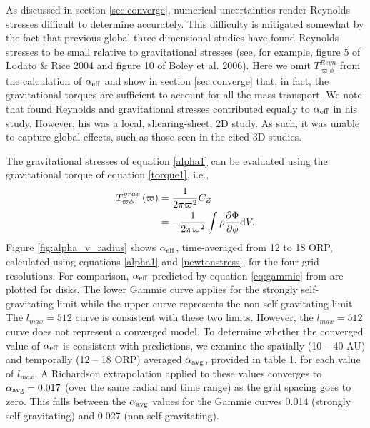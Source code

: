 \documentclass[manuscript]{aastex}
\begin{document}
  

As discussed in section \ref{sec:converge}, numerical uncertainties render Reynolds stresses difficult to
determine accurately.  This difficulty is mitigated somewhat by the fact that previous global three
dimensional studies have found Reynolds stresses to be small relative to gravitational stresses (see, for
example, figure 5 of Lodato \& Rice 2004 and figure 10 of Boley et al. 2006).  Here we omit
$T_{\varpi\phi}^{Reyn}$ from the calculation of $\alpha_{\rm{eff}}$ and show in section \ref{sec:converge}
that, in fact, the gravitational torques are sufficient to account for all the mass transport.  We note that
\cite{gammie2001} found Reynolds and gravitational stresses contributed equally to $\alpha_{\rm{eff}}$ in his
study.  However, his was a local, shearing-sheet, 2D study.  As such, it was unable to capture global effects,
such as those seen in the cited 3D studies.


The gravitational stresses of equation \eqref{alpha1} can be evaluated using the gravitational torque of equation \eqref{torque1}, i.e.,
\begin{equation}
\label{newtonstress}
\begin{split}
 T_{\varpi\phi}^{grav}\left( \varpi \right) & = \frac{1}{2\pi\varpi^2}C_Z\\
                                & = - \frac{1}{2\pi\varpi^2} \int \rho\frac{\partial\Phi}{\partial\phi} {\rm d}V.
\end{split}
\end{equation}
Figure \ref{fig:alpha_v_radius} shows $\alpha_{\rm{eff}}$, time-averaged from 12 to 18 ORP, calculated using equations \eqref{alpha1} and \eqref{newtonstress},
for the four grid resolutions.  For comparison, 
$\alpha_{\rm{eff}}$ predicted by equation \eqref{eq:gammie} from \citet{gammie2001} are plotted for disks.  The lower  Gammie curve applies for the strongly self-gravitating limit while the upper curve 
represents the non-self-gravitating limit.   The $l_{max} = 512$ curve is consistent with these two limits.  However, 
the  $l_{max} = 512$ curve does not represent a converged model.
To determine whether the converged value of $\alpha_{\rm{eff}}$ is consistent with predictions, we examine 
the spatially (10 -- 40 AU) and temporally (12 -- 18 ORP) averaged  $\alpha_{\rm avg}$,
provided in table 1, for each value of  $l_{max}$. A Richardson extrapolation applied to these values  
converges to $\alpha_{\rm avg} = 0.017$ (over the same radial  and time range)
as the grid spacing goes to zero.   This falls
between the $\alpha_{\rm avg}$ values for the Gammie curves 0.014 (strongly self-gravitating) and 0.027 (non-self-gravitating).
\end{document}
